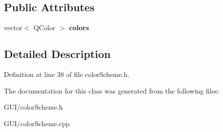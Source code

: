 \subsection*{Public Attributes}
\begin{DoxyCompactItemize}
\item 
\mbox{\label{classcolor_scheme_acbf65bc9cccc6c72d338e09dd0269704}} 
vector$<$ Q\+Color $>$ {\bfseries colors}
\end{DoxyCompactItemize}


\subsection{Detailed Description}


Definition at line 38 of file color\+Scheme.\+h.



The documentation for this class was generated from the following files\+:\begin{DoxyCompactItemize}
\item 
G\+U\+I/color\+Scheme.\+h\item 
G\+U\+I/color\+Scheme.\+cpp\end{DoxyCompactItemize}
